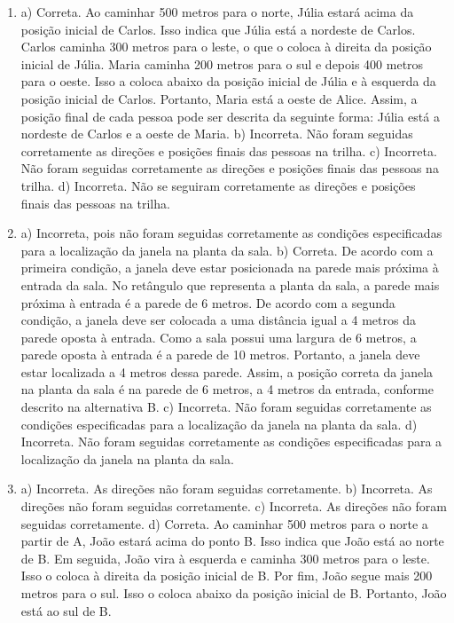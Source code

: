 \begin{enumerate}
\item a) Correta. Ao caminhar 500 metros para o norte, Júlia estará acima da posição inicial de Carlos. Isso indica que Júlia está a nordeste de Carlos. Carlos caminha 300 metros para o leste, o que o
coloca à direita da posição inicial de Júlia. Maria caminha 200 metros
para o sul e depois 400 metros para o oeste. Isso a coloca abaixo da
posição inicial de Júlia e à esquerda da posição inicial de Carlos.
Portanto, Maria está a oeste de Alice. Assim, a posição final de cada
pessoa pode ser descrita da seguinte forma: Júlia está a nordeste de
Carlos e a oeste de Maria.
b) Incorreta. Não foram seguidas corretamente as direções e posições finais das pessoas na trilha.
c) Incorreta. Não foram seguidas corretamente as direções e posições finais das pessoas na trilha.
d) Incorreta. Não se seguiram corretamente as direções e posições finais das pessoas na trilha.

\item a) Incorreta, pois não foram seguidas corretamente as condições
especificadas para a localização da janela na planta da sala.
b) Correta. De acordo com a primeira condição, a janela deve
estar posicionada na parede mais próxima à entrada da sala. No retângulo
que representa a planta da sala, a parede mais próxima à entrada é a
parede de 6 metros. De acordo com a segunda condição, a janela deve ser
colocada a uma distância igual a 4 metros da parede oposta à entrada.
Como a sala possui uma largura de 6 metros, a parede oposta à entrada é
a parede de 10 metros. Portanto, a janela deve estar localizada a 4
metros dessa parede. Assim, a posição correta da janela na planta da
sala é na parede de 6 metros, a 4 metros da entrada, conforme descrito
na alternativa B.
c) Incorreta. Não foram seguidas corretamente as condições
especificadas para a localização da janela na planta da sala.
d) Incorreta. Não foram seguidas corretamente as condições
especificadas para a localização da janela na planta da sala.

\item a) Incorreta. As direções não foram seguidas corretamente.
b) Incorreta. As direções não foram seguidas corretamente.
c) Incorreta. As direções não foram seguidas corretamente.
d) Correta. Ao caminhar 500 metros para o norte a partir de A,
João estará acima do ponto B. Isso indica que João está ao norte de B.
Em seguida, João vira à esquerda e caminha 300 metros para o leste. Isso
o coloca à direita da posição inicial de B. Por fim, João segue mais 200
metros para o sul. Isso o coloca abaixo da posição inicial de B.
Portanto, João está ao sul de B.
\end{enumerate}

